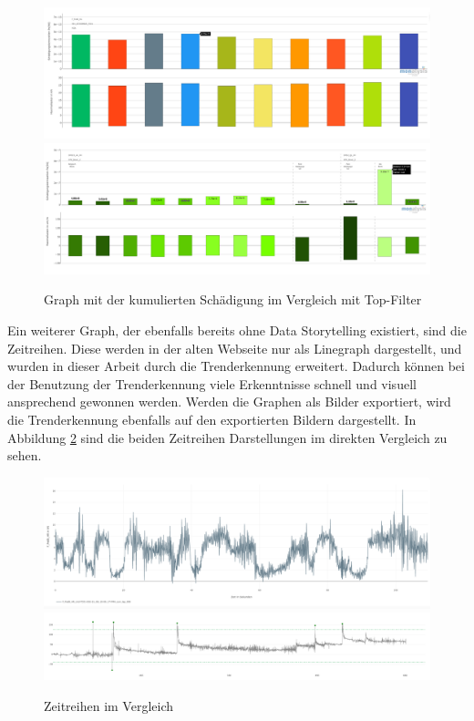 \begin{figure}
    \centering
    \includegraphics[width=1\linewidth]{gfx/top_vergleich_alt.png}
    \includegraphics[width=1\linewidth]{gfx/top_vergleich_neu.png}
    \caption{Graph mit der kumulierten Schädigung im Vergleich mit Top-Filter}
    \label{fig:top_filter_vergleich}
\end{figure}
\noindent
Ein weiterer Graph, der ebenfalls bereits ohne Data Storytelling existiert, sind die Zeitreihen. Diese werden in der alten Webseite nur als Linegraph dargestellt, und wurden in dieser Arbeit durch die Trenderkennung erweitert. Dadurch können bei der Benutzung der Trenderkennung viele Erkenntnisse schnell und visuell ansprechend gewonnen werden. Werden die Graphen als Bilder exportiert, wird die Trenderkennung ebenfalls auf den exportierten Bildern dargestellt. In Abbildung \ref{fig:timeseries_compare} sind die beiden Zeitreihen Darstellungen im direkten Vergleich zu sehen.\\
\begin{figure}[!h]
    \centering
    \includegraphics[width=1\linewidth]{gfx/timeseries_old.png}
    \includegraphics[width=1\linewidth]{gfx/timeseries_new.png}
    \caption{Zeitreihen im Vergleich}
    \label{fig:timeseries_compare}
\end{figure}
